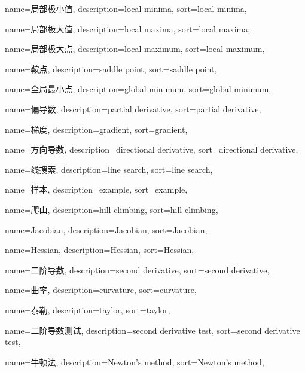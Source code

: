 {
  name=局部极小值,
  description={local minima},
  sort={local minima},
}

{
  name=局部极大值,
  description={local maxima},
  sort={local maxima},
}

{
  name=局部极大点,
  description={local maximum},
  sort={local maximum},
}

{
  name=鞍点,
  description={saddle point},
  sort={saddle point},
}

{
  name=全局最小点,
  description={global minimum},
  sort={global minimum},
}

{
  name=偏导数,
  description={partial derivative},
  sort={partial derivative},
}

{
  name=梯度,
  description={gradient},
  sort={gradient},
}

{
  name=方向导数,
  description={directional derivative},
  sort={directional derivative},
}

{
  name=线搜索,
  description={line search},
  sort={line search},
}

{
  name=样本,
  description={example},
  sort={example},
}

{
  name=爬山,
  description={hill climbing},
  sort={hill climbing},
}

{
  name=Jacobian,
  description={Jacobian},
  sort={Jacobian},
}

{
  name=Hessian,
  description={Hessian},
  sort={Hessian},
}

{
  name=二阶导数,
  description={second derivative},
  sort={second derivative},
}

{
  name=曲率,
  description={curvature},
  sort={curvature},
}

{
  name=泰勒,
  description={taylor},
  sort={taylor},
}

{
  name=二阶导数测试,
  description={second derivative test},
  sort={second derivative test},
}

{
  name=牛顿法,
  description={Newton's method},
  sort={Newton's method},
}

